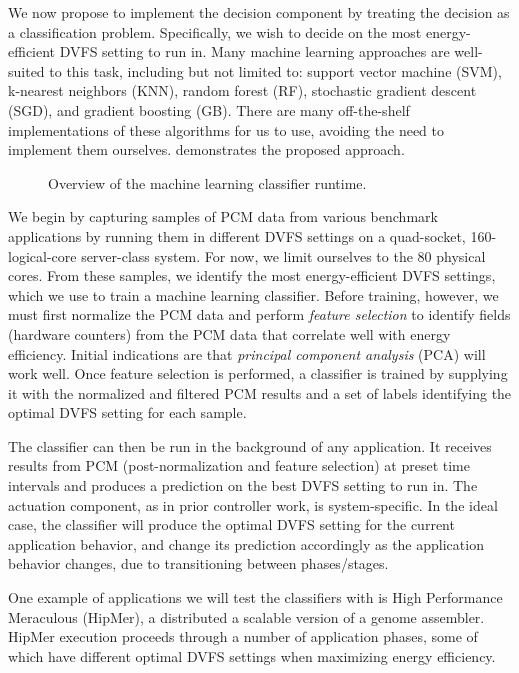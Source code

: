 We now propose to implement the decision component by treating the decision as a classification problem.
Specifically, we wish to decide on the most energy-efficient DVFS setting to run in.
Many machine learning approaches are well-suited to this task, including but not limited to: support vector machine (SVM), k-nearest neighbors (KNN), random forest (RF), stochastic gradient descent (SGD), and gradient boosting (GB).
There are many off-the-shelf implementations of these algorithms for us to use, avoiding the need to implement them ourselves.
 demonstrates the proposed approach.

\begin{figure}[t]
  \begin{centering}
    
    \caption{Overview of the machine learning classifier runtime.}
    \label{fig:classifier-runtime}
  \end{centering}
\end{figure}

We begin by capturing samples of PCM data from various benchmark applications by running them in different DVFS settings on a quad-socket, 160-logical-core server-class system.
For now, we limit ourselves to the 80 physical cores.
From these samples, we identify the most energy-efficient DVFS settings, which we use to train a machine learning classifier.
Before training, however, we must first normalize the PCM data and perform \emph{feature selection} to identify fields (hardware counters) from the PCM data that correlate well with energy efficiency.
Initial indications are that \emph{principal component analysis} (PCA) will work well.
Once feature selection is performed, a classifier is trained by supplying it with the normalized and filtered PCM results and a set of labels identifying the optimal DVFS setting for each sample.

The classifier can then be run in the background of any application.
It receives results from PCM (post-normalization and feature selection) at preset time intervals and produces a prediction on the best DVFS setting to run in.
The actuation component, as in prior controller work, is system-specific.
In the ideal case, the classifier will produce the optimal DVFS setting for the current application behavior, and change its prediction accordingly as the application behavior changes, \eg due to transitioning between phases/stages.

One example of applications we will test the classifiers with is High Performance Meraculous (HipMer), a distributed a scalable version of a genome assembler.
HipMer execution proceeds through a number of application phases, some of which have different optimal DVFS settings when maximizing energy efficiency.

